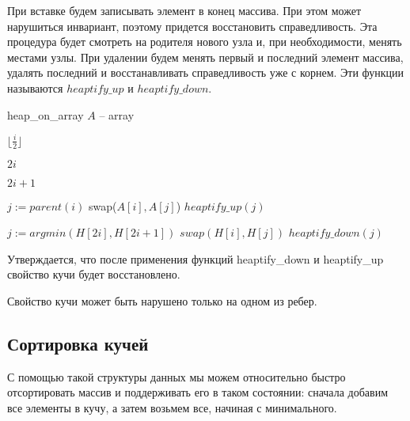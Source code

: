 \documentclass[../main.tex]{subfiles}
\begin{document}
	При вставке будем записывать элемент в конец массива. При этом может нарушиться инвариант, поэтому придется восстановить справедливость. Эта процедура будет смотреть на родителя нового узла и, при необходимости, менять местами узлы. При удалении будем менять первый и последний элемент массива, удалять последний и восстанавливать справедливость уже с корнем. Эти функции называются $heaptify\_up$ и $heaptify\_down$.

	\begin{struct}{heap\_on\_array}
		\State $A$ -- array
		
			\State \Return $\lfloor\frac{i}{2}\rfloor$ 
		\EndFunction
		
		\State
		
			\State \Return $2i$
		\EndFunction
		
		\State
		
			\State \Return $2i + 1$
		\EndFunction
		
		\State 
		
				\State $j := parent(i)$
					\State swap($A[i], A[j]$)
					\State $heaptify\_up(j)$
				\EndIf
			\EndIf
		\EndFunction
		
		\State
		
				\State $j := argmin(H[2i], H[2i +1])$
					\State $swap(H[i], H[j])$
					\State $heaptify\_down(j)$				
				\EndIf
			\EndIf
		\EndFunction
	\end{struct}
	
	Утверждается, что после применения функций heaptify\_down и heaptify\_up свойство кучи будет восстановлено.
	
	\begin{statement}
		Свойство кучи может быть нарушено только на одном из ребер.
	\end{statement}

	
	\subsection{Сортировка кучей}
	С помощью такой структуры данных мы можем относительно быстро отсортировать массив и поддерживать его в таком состоянии: сначала добавим все элементы в кучу, а затем возьмем все, начиная с минимального.
	
	\pagebreak
\end{document}
